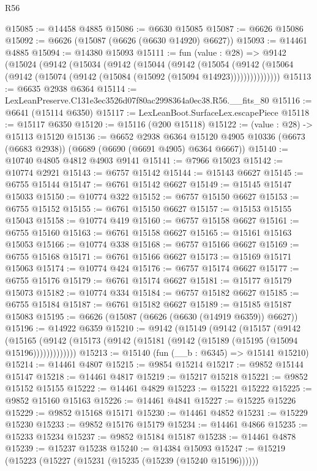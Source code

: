 \begin{lexlean}{R56}
\begin{coremodule}
@15085 := @14458 @4885
@15086 := @6630 @15085
@15087 := @6626 @15086
@15092 := @6626 (@15087 (@6626 (@6630 @14920) @6627))
@15093 := @14461 @4885
@15094 := @14380 @15093
@15111 := fun (value : @28) =>
  @9142
    (@15024
      (@9142
        (@15034
          (@9142
            (@15044
              (@9142
                (@15054
                  (@9142 (@15064 (@9142 (@15074 (@9142 (@15084 (@15092 (@15094 @14923)))))))))))))))
@15113 := @6635 @2938 @6364
@15114 := LexLeanPreserve.C131e3ec3526d07f80ac2998364a0ec38.R56.__fits_80
@15116 := @6641 (@15114 @6350)
@15117 := LexLeanBoot.SurfaceLex.escapePiece
@15118 := @15117 @6350
@15120 := @15116 (@200 @15118)
@15122 := (value : @28) -> @15113 @15120
@15136 := @6652
    @2938
    @6364
    @15120
    @4905
    @10336
    (@6673 (@6683 @2938))
    (@6689 (@6690 (@6691 @4905) @6364 @6667))
@15140 := @10740 @4805 @4812 @4903 @9141
@15141 := @7966 @15023
@15142 := @10774 @2921
@15143 := @6757 @15142
@15144 := @15143 @6627
@15145 := @6755 @15144
@15147 := @6761 @15142 @6627
@15149 := @15145 @15147 @15033
@15150 := @10774 @322
@15152 := @6757 @15150 @6627
@15153 := @6755 @15152
@15155 := @6761 @15150 @6627
@15157 := @15153 @15155 @15043
@15158 := @10774 @419
@15160 := @6757 @15158 @6627
@15161 := @6755 @15160
@15163 := @6761 @15158 @6627
@15165 := @15161 @15163 @15053
@15166 := @10774 @338
@15168 := @6757 @15166 @6627
@15169 := @6755 @15168
@15171 := @6761 @15166 @6627
@15173 := @15169 @15171 @15063
@15174 := @10774 @424
@15176 := @6757 @15174 @6627
@15177 := @6755 @15176
@15179 := @6761 @15174 @6627
@15181 := @15177 @15179 @15073
@15182 := @10774 @334
@15184 := @6757 @15182 @6627
@15185 := @6755 @15184
@15187 := @6761 @15182 @6627
@15189 := @15185 @15187 @15083
@15195 := @6626 (@15087 (@6626 (@6630 (@14919 @6359)) @6627))
@15196 := @14922 @6359
@15210 := @9142
    (@15149
      (@9142
        (@15157
          (@9142
            (@15165 (@9142 (@15173 (@9142 (@15181 (@9142 (@15189 (@15195 (@15094 @15196)))))))))))))
@15213 := @15140 (fun (__b : @6345) => @15141 @15210)
@15214 := @14461 @4807
@15215 := @9854 @15214
@15217 := @9852 @15144 @15147
@15218 := @14461 @4817
@15219 := @15217 @15218
@15221 := @9852 @15152 @15155
@15222 := @14461 @4829
@15223 := @15221 @15222
@15225 := @9852 @15160 @15163
@15226 := @14461 @4841
@15227 := @15225 @15226
@15229 := @9852 @15168 @15171
@15230 := @14461 @4852
@15231 := @15229 @15230
@15233 := @9852 @15176 @15179
@15234 := @14461 @4866
@15235 := @15233 @15234
@15237 := @9852 @15184 @15187
@15238 := @14461 @4878
@15239 := @15237 @15238
@15240 := @14384 @15093
@15247 := @15219 (@15223 (@15227 (@15231 (@15235 (@15239 (@15240 @15196))))))

\end{coremodule}
\end{lexlean}
